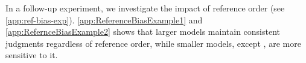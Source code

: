 In a follow-up experiment, we investigate the impact of reference order (see \cref{app:ref-bias-exp}). \cref{app:ReferenceBiasExample1} and \cref{app:RefernceBiasExample2} shows that larger models maintain consistent judgments regardless of reference order, while smaller models, except , are more sensitive to it.






